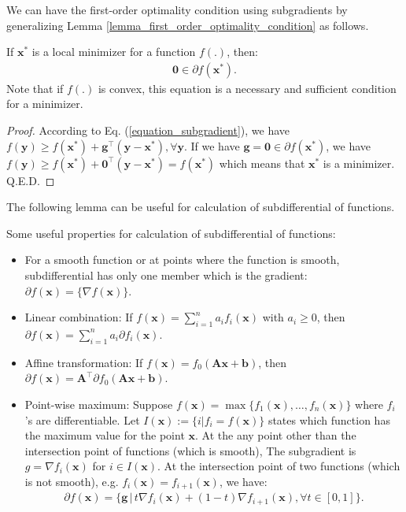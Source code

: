 \documentclass[lang=cn,10pt]{gorgeousnbook}
\numberwithin{equation}{section}%
\numberwithin{figure}{section}%
\begin{document}
We can have the first-order optimality condition using subgradients by generalizing Lemma \ref{lemma_first_order_optimality_condition} as follows.
\begin{lemma}\label{lemma_first_order_optimality_condition_subgradient}
If $\boldsymbol{x}^*$ is a local minimizer for a function $f(.)$, then:
\begin{align}\label{equation_first_order_optimality_condition_subgradient}
\boldsymbol{0} \in \partial f(\boldsymbol{x}^*).
\end{align}
Note that if $f(.)$ is convex, this equation is a necessary and sufficient condition for a minimizer. 
\end{lemma}
\begin{proof}
According to Eq. (\ref{equation_subgradient}), we have $f(\boldsymbol{y}) \geq f(\boldsymbol{x}^*) + \boldsymbol{g}^\top (\boldsymbol{y} - \boldsymbol{x}^*), \forall \boldsymbol{y}$.
If we have $\boldsymbol{g} = \boldsymbol{0} \in \partial f(\boldsymbol{x}^*)$, we have $f(\boldsymbol{y}) \geq f(\boldsymbol{x}^*) + \boldsymbol{0}^\top (\boldsymbol{y} - \boldsymbol{x}^*) = f(\boldsymbol{x}^*)$ which means that $\boldsymbol{x}^*$ is a minimizer. Q.E.D.
\end{proof}

The following lemma can be useful for calculation of subdifferential of functions. 
\begin{lemma}\label{lemma_properties_subdifferential}
Some useful properties for calculation of subdifferential of functions:
\begin{itemize}
\item For a smooth function or at points where the function is smooth, subdifferential has only one member which is the gradient: $\partial f(\boldsymbol{x}) = \{\nabla f(\boldsymbol{x})\}$.
\item Linear combination: If $f(\boldsymbol{x}) = \sum_{i=1}^n a_i f_i(\boldsymbol{x})$ with $a_i \geq 0$, then $\partial f(\boldsymbol{x}) = \sum_{i=1}^n a_i \partial f_i(\boldsymbol{x})$.
\item Affine transformation: If $f(\boldsymbol{x}) = f_0(\boldsymbol{A}\boldsymbol{x} + \boldsymbol{b})$, then $\partial f(\boldsymbol{x}) = \boldsymbol{A}^\top \partial f_0(\boldsymbol{A}\boldsymbol{x} + \boldsymbol{b})$.
\item Point-wise maximum: Suppose $f(\boldsymbol{x}) = \max\{f_1(\boldsymbol{x}), \dots, f_n(\boldsymbol{x})\}$ where $f_i$'s are differentiable. Let $I(\boldsymbol{x}) := \{i | f_i = f(\boldsymbol{x})\}$ states which function has the maximum value for the point $\boldsymbol{x}$. At the any point other than the intersection point of functions (which is smooth), The subgradient is $g = \nabla f_i(\boldsymbol{x})$ for $i \in I(\boldsymbol{x})$. At the intersection point of two functions (which is not smooth), e.g. $f_i(\boldsymbol{x}) = f_{i+1}(\boldsymbol{x})$, we have:
\begin{align*}
\partial f(\boldsymbol{x}) = \{\boldsymbol{g}\, |\, t \nabla f_i(\boldsymbol{x}) + (1-t) \nabla f_{i+1}(\boldsymbol{x}), \forall t \in [0,1]\}.
\end{align*}
\end{itemize}
\end{lemma}
\end{document}
